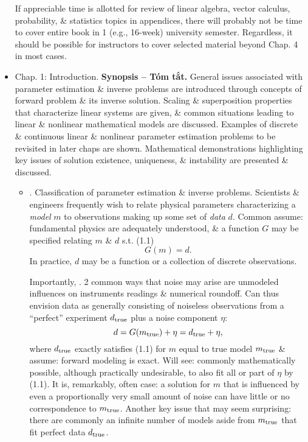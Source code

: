 \documentclass{article}
\begin{document}
\begin{itemize}
	If appreciable time is allotted for review of linear algebra, vector calculus, probability, \& statistics topics in appendices, there will probably not be time to cover entire book in 1 (e.g., 16-week) university semester. Regardless, it should be possible for instructors to cover selected material beyond Chap. 4 in most cases.
	\item {\sf Chap. 1: Introduction.} {\bf Synopsis -- Tóm tắt.} General issues associated with parameter estimation \& inverse problems are introduced through concepts of forward problem \& its inverse solution. Scaling \& superposition properties that characterize linear systems are given, \& common situations leading to linear \& nonlinear mathematical models are discussed. Examples of discrete \& continuous linear \& nonlinear parameter estimation problems to be revisited in later chaps are shown. Mathematical demonstrations highlighting key issues of solution existence, uniqueness, \& instability are presented \& discussed.
	\begin{itemize}
		\item {. Classification of parameter estimation \& inverse problems.} Scientists \& engineers frequently wish to relate physical parameters characterizing a {\it model} $m$ to observations making up some set of {\it data} $d$. Common assume: fundamental physics are adequately understood, \& a function $G$ may be specified relating $m$ \& $d$ s.t. (1.1)
		\begin{equation*}
			G(m) = d.
		\end{equation*}
		In practice, $d$ may be a function or a collection of discrete observations.
		
		Importantly, . 2 common ways that noise may arise are unmodeled influences on instruments readings \& numerical roundoff. Can thus envision data as generally consisting of noiseless observations from a ``perfect'' experiment $d_{\rm true}$ plus a noise component $\eta$:
		\begin{equation*}
			d = G(m_{\rm true}) + \eta = d_{\rm true} + \eta,
		\end{equation*}
		where $d_{\rm true}$ exactly satisfies (1.1) for $m$ equal to true model $m_{\rm true}$ \& assume: forward modeling is exact. Will see: commonly mathematically possible, although practically undesirable, to also fit all or part of $\eta$ by (1.1). It is, remarkably, often case: a solution for $m$ that is influenced by even a proportionally very small amount of noise can have little or no correspondence to $m_{\rm true}$. Another key issue that may seem surprising: there are commonly an infinite number of models aside from $m_{\rm true}$ that fit perfect data $d_{\rm true}$.
		

\end{itemize}
\end{itemize}
\end{document}
